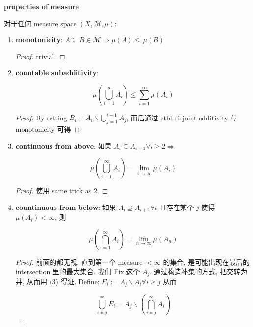 \documentclass{qlnotes-export}
\begin{document}
\begin{theorem}{\protect{}\label{kn-properties-of-measure}{\textbf{properties
of measure}}}

对于任何 measure space \((X,\mathcal{M},\mu)\):

\begin{enumerate}
\item
  \textbf{monotonicity}: \(A \subseteq B \in \mathcal{M}\Longrightarrow\mu(A) \leq \,\mu(B)\)

  \begin{proof}

  trivial.

  \end{proof}
\item
  \textbf{countable subadditivity}:

  \[\mu(\bigcup\limits_{i = 1}^{\infty}A_{i}) \leq \sum\limits_{i = 1}^{\infty}\mu(A_{i})\]

  \begin{proof}

  By setting \(B_{i} = A_{i}\backslash\bigcup_{j = 1}^{i - 1}A_{j}\), 而后通过 ctbl disjoint additivity 与 monotonicity 可得

  \end{proof}
\item
  \textbf{continuous from above}: 如果 \(A_{i} \subseteq A_{i + 1}\forall i \geq 2\Longrightarrow\)

  \[\mu(\bigcup\limits_{i = 1}^{\infty}A_{i}) = \lim\limits_{i\rightarrow\infty}\mu(A_{i})\]

  \begin{proof}

  使用 same trick as 2.

  \end{proof}
\item
  \textbf{countinuous from below}: 如果 \(A_{i} \supseteq A_{i + 1}\forall i\) 且存在某个 \(j\) 使得 \(\mu(A_{i}) < \infty\), 则

  \[\mu(\bigcap\limits_{i = 1}^{\infty}A_{i}) = \lim\limits_{n\rightarrow\infty}\mu(A_{n})\]

  \begin{proof}

  前面的都无视, 直到第一个 measure \(< \infty\) 的集合, 是可能出现在最后的 intersection 里的最大集合. 我们 Fix 这个 \(A_{j}\). 通过构造补集的方式, 把交转为并, 从而用 (3) 得证. Define: \(E_{i} := A_{j}\backslash A_{i}\forall i \geq j\) 从而

  \[\bigcup\limits_{i = j}^{\infty}E_{i} = A_{j}\backslash(\bigcap\limits_{i = j}^{\infty}A_{i})\]


\end{proof}
\end{enumerate}
\end{theorem}
\end{document}
